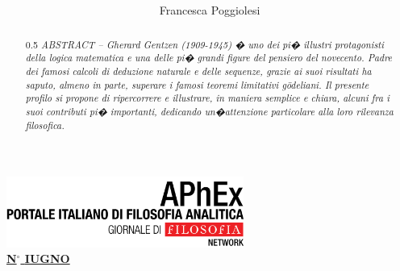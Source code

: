 \documentclass[a4paper,12pt]{aphex}
\begin{document}
\title{
\mbox{} \\
{} \\[-2mm]
\textsc{
\noindent
{}}
}
\author{Francesca Poggiolesi}

\maketitle
\thispagestyle{front}

\begin{abstract}
{\footnotesize
{\setlength{\baselineskip}
{0.5\baselineskip}
\emph{\noindent 
ABSTRACT -- Gherard Gentzen (1909-1945) � uno dei pi� illustri protagonisti  della logica matematica e  una delle pi� grandi figure del pensiero del  novecento. Padre dei famosi calcoli di deduzione naturale e delle sequenze, grazie ai suoi risultati ha saputo, almeno in parte, superare i famosi teoremi limitativi g\"odeliani. Il presente profilo si propone di ripercorrere e illustrare, in maniera semplice e chiara, alcuni fra i suoi contributi pi� importanti, dedicando un�attenzione particolare alla loro rilevanza filosofica. }
\par}}
\end{abstract}
\vspace*{-155mm}
{
\begin{flushright}
\includegraphics[width=77.82mm]{aphex}
\\[-5pt] \sffamily
\underline{\textbf{\scriptsize{N}$^{{\circ}}$
\scriptsize{IUGNO} }}
\\[122mm]
\end{flushright}
\par}
\def\contentsname{} 
\def\refname{\textsc{Riferimenti bibliografici}}
\tableofcontents
\end{document}
